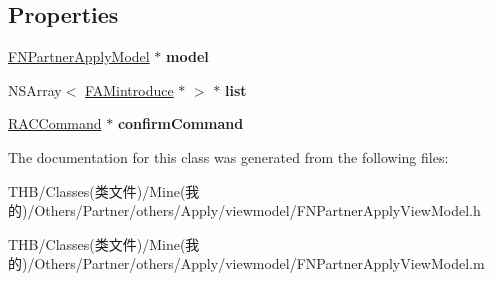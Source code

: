 \subsection*{Properties}
\begin{DoxyCompactItemize}
\item 
\mbox{\label{interface_f_n_partner_apply_view_model_ad5f1f244888b0bca172fd92fc34d4fcb}} 
\mbox{\hyperlink{interface_f_n_partner_apply_model}{F\+N\+Partner\+Apply\+Model}} $\ast$ {\bfseries model}
\item 
\mbox{\label{interface_f_n_partner_apply_view_model_abb4a8b7ab55429ae8540cc6fe832f86b}} 
N\+S\+Array$<$ \mbox{\hyperlink{interface_f_a_mintroduce}{F\+A\+Mintroduce}} $\ast$ $>$ $\ast$ {\bfseries list}
\item 
\mbox{\label{interface_f_n_partner_apply_view_model_a092da359d98028542bb204e6b37a25bb}} 
\mbox{\hyperlink{interface_r_a_c_command}{R\+A\+C\+Command}} $\ast$ {\bfseries confirm\+Command}
\end{DoxyCompactItemize}


The documentation for this class was generated from the following files\+:\begin{DoxyCompactItemize}
\item 
T\+H\+B/\+Classes(类文件)/\+Mine(我的)/\+Others/\+Partner/others/\+Apply/viewmodel/F\+N\+Partner\+Apply\+View\+Model.\+h\item 
T\+H\+B/\+Classes(类文件)/\+Mine(我的)/\+Others/\+Partner/others/\+Apply/viewmodel/F\+N\+Partner\+Apply\+View\+Model.\+m\end{DoxyCompactItemize}
